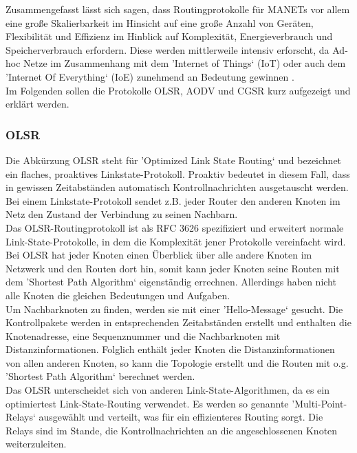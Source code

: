 Zusammengefasst lässt sich sagen, dass Routingprotokolle für MANETs vor allem eine große Skalierbarkeit im Hinsicht auf eine große Anzahl von Geräten, Flexibilität und Effizienz im Hinblick auf Komplexität, Energieverbrauch und Speicherverbrauch erfordern. Diese werden mittlerweile intensiv erforscht, da Ad-hoc Netze im Zusammenhang mit dem 'Internet of Things‘ (IoT) oder auch dem 'Internet Of Everything‘ (IoE) zunehmend an Bedeutung gewinnen \cite{d:timm}. \\

Im Folgenden sollen die Protokolle OLSR, AODV und CGSR kurz aufgezeigt und erklärt werden.

\subsubsection{OLSR}\label{ss:OLSR}

Die Abkürzung OLSR steht für 'Optimized Link State Routing‘ und bezeichnet ein flaches, proaktives Linkstate-Protokoll. Proaktiv bedeutet in diesem Fall, dass in gewissen Zeitabständen automatisch Kontrollnachrichten ausgetauscht werden. Bei einem Linkstate-Protokoll sendet z.B. jeder Router den anderen Knoten im Netz den Zustand der Verbindung zu seinen Nachbarn. \\
Das OLSR-Routingprotokoll ist als RFC 3626 spezifiziert und erweitert normale Link-State-Protokolle, in dem die Komplexität jener Protokolle vereinfacht wird. \\
Bei OLSR hat jeder Knoten einen Überblick über alle andere Knoten im Netzwerk und den Routen dort hin, somit kann jeder Knoten seine Routen mit dem 'Shortest Path Algorithm‘ eigenständig errechnen. Allerdings haben nicht alle Knoten die gleichen Bedeutungen und Aufgaben.\\
Um Nachbarknoten zu finden, werden sie mit einer 'Hello-Message‘ gesucht. Die Kontrollpakete werden in entsprechenden Zeitabständen erstellt und enthalten die Knotenadresse, eine Sequenznummer und die Nachbarknoten mit Distanzinformationen. Folglich enthält jeder Knoten die Distanzinformationen von allen anderen Knoten, so kann die Topologie erstellt und die Routen mit o.g. 'Shortest Path Algorithm‘ berechnet werden. \\

Das OLSR unterscheidet sich von anderen Link-State-Algorithmen, da es ein optimiertest Link-State-Routing verwendet. Es werden so genannte 'Multi-Point-Relays‘ ausgewählt und verteilt, was für ein effizienteres Routing sorgt. Die Relays sind im Stande, die Kontrollnachrichten an die angeschlossenen Knoten weiterzuleiten.

